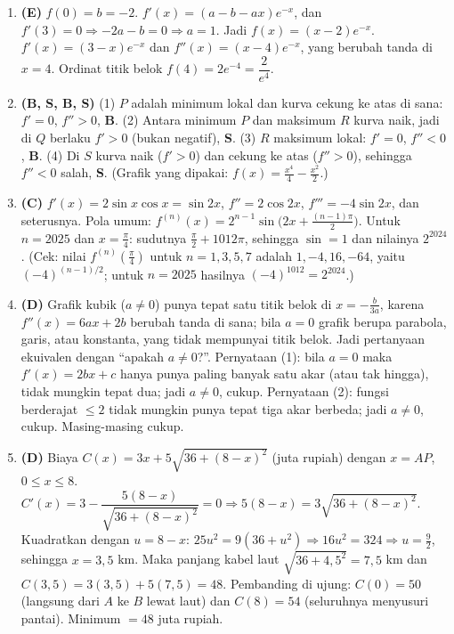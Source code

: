 \documentclass[a4paper,11pt]{article}
\newcounter{no}
\begin{document}
\begin{enumerate}[leftmargin=2em,itemsep=2pt,topsep=2pt]
\item[\textbf{16.}] \textbf{(E)} $f(0)=b=-2$. $f'(x)=(a-b-ax)e^{-x}$, dan $f'(3)=0\Rightarrow-2a-b=0\Rightarrow a=1$. Jadi $f(x)=(x-2)e^{-x}$. $f'(x)=(3-x)e^{-x}$ dan $f''(x)=(x-4)e^{-x}$, yang berubah tanda di $x=4$. Ordinat titik belok $f(4)=2e^{-4}=\dfrac2{e^4}$.
\item[\textbf{17.}] \textbf{(B, S, B, S)} (1) $P$ adalah minimum lokal dan kurva cekung ke atas di sana: $f'=0$, $f''>0$, \textbf{B}. (2) Antara minimum $P$ dan maksimum $R$ kurva naik, jadi di $Q$ berlaku $f'>0$ (bukan negatif), \textbf{S}. (3) $R$ maksimum lokal: $f'=0$, $f''<0$, \textbf{B}. (4) Di $S$ kurva naik ($f'>0$) dan cekung ke atas ($f''>0$), sehingga $f''<0$ salah, \textbf{S}. (Grafik yang dipakai: $f(x)=\frac{x^4}4-\frac{x^2}2$.)
\item[\textbf{18.}] \textbf{(C)} $f'(x)=2\sin x\cos x=\sin2x$, $f''=2\cos2x$, $f'''=-4\sin2x$, dan seterusnya. Pola umum: $f^{(n)}(x)=2^{n-1}\sin\!\big(2x+\tfrac{(n-1)\pi}2\big)$. Untuk $n=2025$ dan $x=\frac\pi4$: sudutnya $\frac\pi2+1012\pi$, sehingga $\sin=1$ dan nilainya $2^{2024}$. (Cek: nilai $f^{(n)}(\frac\pi4)$ untuk $n=1,3,5,7$ adalah $1,-4,16,-64$, yaitu $(-4)^{(n-1)/2}$; untuk $n=2025$ hasilnya $(-4)^{1012}=2^{2024}$.)
\item[\textbf{19.}] \textbf{(D)} Grafik kubik ($a\neq0$) punya tepat satu titik belok di $x=-\frac b{3a}$, karena $f''(x)=6ax+2b$ berubah tanda di sana; bila $a=0$ grafik berupa parabola, garis, atau konstanta, yang tidak mempunyai titik belok. Jadi pertanyaan ekuivalen dengan ``apakah $a\neq0$?''. Pernyataan (1): bila $a=0$ maka $f'(x)=2bx+c$ hanya punya paling banyak satu akar (atau tak hingga), tidak mungkin tepat dua; jadi $a\neq0$, cukup. Pernyataan (2): fungsi berderajat $\le2$ tidak mungkin punya tepat tiga akar berbeda; jadi $a\neq0$, cukup. Masing-masing cukup.
\item[\textbf{20.}] \textbf{(D)} Biaya $C(x)=3x+5\sqrt{36+(8-x)^2}$ (juta rupiah) dengan $x=AP$, $0\le x\le8$. $C'(x)=3-\dfrac{5(8-x)}{\sqrt{36+(8-x)^2}}=0\Rightarrow5(8-x)=3\sqrt{36+(8-x)^2}$. Kuadratkan dengan $u=8-x$: $25u^2=9(36+u^2)\Rightarrow16u^2=324\Rightarrow u=\frac92$, sehingga $x=3{,}5$ km. Maka panjang kabel laut $\sqrt{36+4{,}5^2}=7{,}5$ km dan $C(3{,}5)=3(3{,}5)+5(7{,}5)=48$. Pembanding di ujung: $C(0)=50$ (langsung dari $A$ ke $B$ lewat laut) dan $C(8)=54$ (seluruhnya menyusuri pantai). Minimum $=48$ juta rupiah.
\end{enumerate}
\par{}\par\vspace{0.2em}
\end{document}

